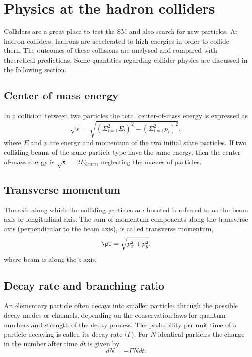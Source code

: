 \section{Physics at the hadron colliders}
Colliders are a great place to test the SM and also search for new particles. At hadron colliders,
hadrons are accelerated to high energies in order to collide them. The 
outcomes of these collisions are analysed and compared with theoretical predictions. Some quantities
regarding collider physics are discussed in the following section.  


\subsection*{Center-of-mass energy}
In a collision between two particles the total center-of-mass energy is expressed as
\begin{equation}
    \sqrt{s} = \sqrt{(\Sigma_{i = 1}^{2} E_i)^2 - (\Sigma_{i = 1}^{2} p_i)^2},
\end{equation}
where $E$ and $p$ are energy and momentum of the two initial state particles. If two colliding beams 
of the same particle type have the same energy, then the center-of-mass energy is 
$\sqrt{s}$ = $2E_{beam}$, neglecting the masses of particles. 

\subsection*{Transverse momentum}
The axis along which the colliding particles are boosted is referred to as the beam axis or 
longitudinal axis. The sum of momentum components along the transverse axis (perpendicular 
to the beam axis), is called transverse momentum,
\begin{equation}
    \pT = \sqrt{p_x^2 + p_y^2}.
\end{equation}
where beam is along the \textit{z}-axis. 


\subsection*{Decay rate and branching ratio}

An elementary particle often decays into smaller particles through the possible decay modes or 
channels, depending on the conservation laws for quantum numbers and strength of the decay process. 
The probability per unit time of a particle decaying is called its decay rate ($\Gamma$). For $N$ 
identical particles the change in the number after time \textit{dt} is given by
\begin{equation}
    dN = - \Gamma N dt.
\end{equation}


